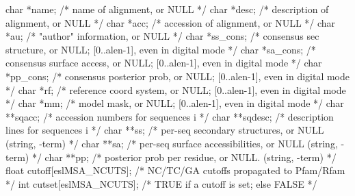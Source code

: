 \begin{cchunk}
  char  *name;      /* name of alignment, or NULL                                           */
  char  *desc;      /* description of alignment, or NULL                                    */
  char  *acc;       /* accession of alignment, or NULL                                      */
  char  *au;        /* "author" information, or NULL                                        */
  char  *ss_cons;   /* consensus sec structure, or NULL;  [0..alen-1], even in digital mode */
  char  *sa_cons;   /* consensus surface access, or NULL; [0..alen-1], even in digital mode */
  char  *pp_cons;   /* consensus posterior prob, or NULL; [0..alen-1], even in digital mode */
  char  *rf;        /* reference coord system, or NULL;   [0..alen-1], even in digital mode */
  char  *mm;        /* model mask, or NULL;   [0..alen-1], even in digital mode             */
  char **sqacc;     /* accession numbers for sequences i                                    */
  char **sqdesc;    /* description lines for sequences i                                    */
  char **ss;        /* per-seq secondary structures, or NULL    (string, \0-term)           */
  char **sa;        /* per-seq surface accessibilities, or NULL (string, \0-term)           */
  char **pp;        /* posterior prob per residue, or NULL.     (string, \0-term)           */
  float  cutoff[eslMSA_NCUTS];  /* NC/TC/GA cutoffs propagated to Pfam/Rfam                 */
  int    cutset[eslMSA_NCUTS];  /* TRUE if a cutoff is set; else FALSE                      */
\end{cchunk}
